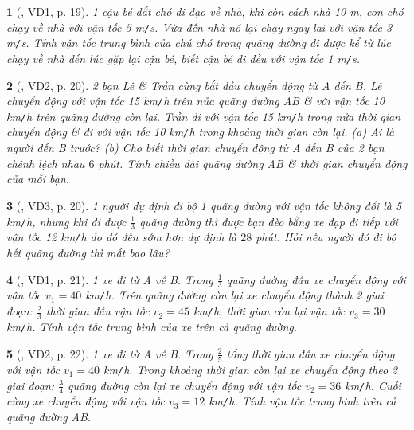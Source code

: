 \documentclass{article}
\newtheorem{baitoan}{}
\begin{document}
\begin{baitoan}[\cite{Van_Quyen_Hanh_Nhu_10_chuyen_Ly}, VD1, p. 19]
	1 cậu bé dắt chó đi dạo về nhà, khi còn cách nhà {\rm10 m}, con chó chạy về nhà với vận tốc {\rm5 m{\tt/}s}. Vừa đến nhà nó lại chạy ngay lại với vận tốc {\rm3 m{\tt/}s}. Tính vận tốc trung bình của chú chó trong quãng đường đi được kể từ lúc chạy về nhà đến lúc gặp lại cậu bé, biết cậu bé đi đều với vận tốc {\rm1 m{\tt/}s}.
\end{baitoan}

\begin{baitoan}[\cite{Van_Quyen_Hanh_Nhu_10_chuyen_Ly}, VD2, p. 20]
	2 bạn Lê \& Trần cùng bắt đầu chuyển động từ A đến B. Lê chuyển động với vận tốc {\rm15 km{\tt/}h} trên nửa quãng đường AB \& với vận tốc {\rm10 km{\tt/}h} trên quãng đường còn lại. Trần đi với vận tốc {\rm15 km{\tt/}h} trong nửa thời gian chuyển động \& đi với vận tốc {\rm10 km{\tt/}h} trong khoảng thời gian còn lại. (a) Ai là người đến B trước? (b) Cho biết thời gian chuyển động từ A đến B của 2 bạn chênh lệch nhau $6$ phút. Tính chiều dài quãng đường AB \& thời gian chuyển động của mỗi bạn.
\end{baitoan}

\begin{baitoan}[\cite{Van_Quyen_Hanh_Nhu_10_chuyen_Ly}, VD3, p. 20]
	1 người dự định đi bộ 1 quãng đường với vận tốc không đổi là {\rm5 km{\tt/}h}, nhưng khi đi được $\frac{1}{3}$ quãng đường thì được bạn đèo bằng xe đạp đi tiếp với vận tốc {\rm12 km{\tt/}h} do đó đến sớm hơn dự định là $28$ phút. Hỏi nếu người đó đi bộ hết quãng đường thì mất bao lâu?
\end{baitoan}

\begin{baitoan}[\cite{Van_Quyen_Hanh_Nhu_10_chuyen_Ly}, VD1, p. 21]
	1 xe đi từ A về B. Trong $\frac{1}{3}$ quãng đường đầu xe chuyển động với vận tốc $v_1 = 40$ {\rm km{\tt/}h}. Trên quãng đường còn lại xe chuyển động thành 2 giai đoạn: $\frac{2}{3}$ thời gian đầu vận tốc $v_2 = 45$ {\rm km{\tt/}h}, thời gian còn lại vận tốc $v_3 = 30$ {\rm km{\tt/}h}. Tính vận tốc trung bình của xe trên cả quãng đường.
\end{baitoan}

\begin{baitoan}[\cite{Van_Quyen_Hanh_Nhu_10_chuyen_Ly}, VD2, p. 22]
	1 xe đi từ A về B. Trong $\frac{2}{5}$ tổng thời gian đầu xe chuyển động với vận tốc $v_1 = 40$ {\rm km{\tt/}h}. Trong khoảng thời gian còn lại xe chuyển động theo 2 giai đoạn: $\frac{3}{4}$ quãng đường còn lại xe chuyển động với vận tốc $v_2 = 36$ {\rm km{\tt/}h}. Cuối cùng xe chuyển động với vận tốc $v_3 = 12$ {\rm km{\tt/}h}. Tính vận tốc trung bình trên cả quãng đường AB.
\end{baitoan}
\end{document}
